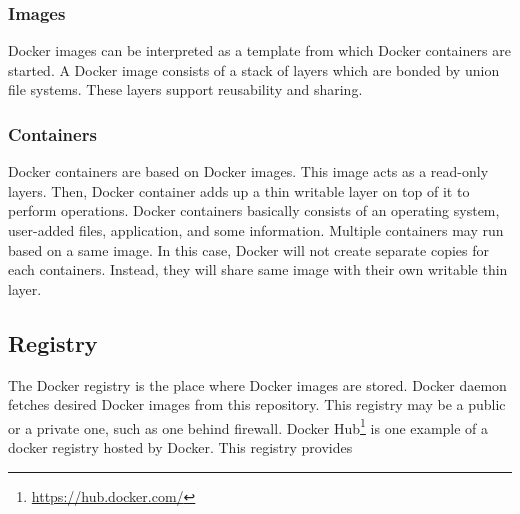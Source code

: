 
\subsubsection{Images}
Docker images can be interpreted as a template from which Docker containers are
started. A Docker image consists of a stack of layers which are bonded by union
file systems. These layers support reusability and sharing.

\subsubsection{Containers}
Docker containers are based on Docker images. This image acts as a read-only
layers. Then, Docker container adds up a thin writable layer on top of it to
perform operations. Docker containers basically consists of an operating system,
user-added files, application, and some information. Multiple containers may run
based on a same image. In this case, Docker will not create separate copies for
each containers. Instead, they will share same image with their own writable
thin layer.

\subsection{Registry}
The Docker registry is the place where Docker images are stored. Docker daemon
fetches desired Docker images from this repository. This registry may be a
public or a private one, such as one behind firewall. Docker
Hub\footnote{\url{https://hub.docker.com/}} is one example of a docker registry
hosted by Docker. This registry provides
